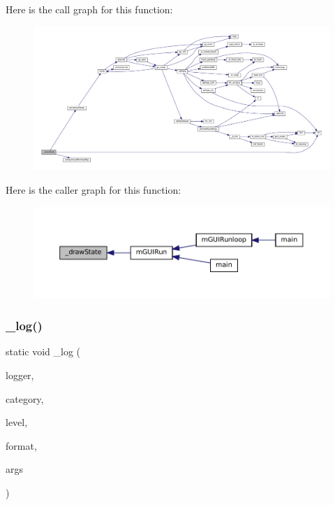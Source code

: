 Here is the call graph for this function\+:
\nopagebreak
\begin{figure}[H]
\begin{center}
\leavevmode
\includegraphics[width=350pt]{gui-runner_8c_a6d8815542c91f5581f48b3c11ced7d14_cgraph}
\end{center}
\end{figure}
Here is the caller graph for this function\+:
\nopagebreak
\begin{figure}[H]
\begin{center}
\leavevmode
\includegraphics[width=350pt]{gui-runner_8c_a6d8815542c91f5581f48b3c11ced7d14_icgraph}
\end{center}
\end{figure}
\mbox{\label{gui-runner_8c_abd0ecb64e5e72d771823f2e8aa966fc6}} 
\subsubsection{\texorpdfstring{\+\_\+log()}{\_log()}}
{\footnotesize\ttfamily static void \+\_\+log (\begin{DoxyParamCaption}\item[{struct m\+Logger $\ast$}]{logger,  }\item[{\mbox{\hyperlink{ioapi_8h_a787fa3cf048117ba7123753c1e74fcd6}{int}}}]{category,  }\item[{enum m\+Log\+Level}]{level,  }\item[{const char $\ast$}]{format,  }\item[{\mbox{\hyperlink{__builder_8h_a2b7adf9b9fd4a58a693dc7cfba5b9006}{va\+\_\+list}}}]{args }\end{DoxyParamCaption})\hspace{0.3cm}{\ttfamily [static]}}

